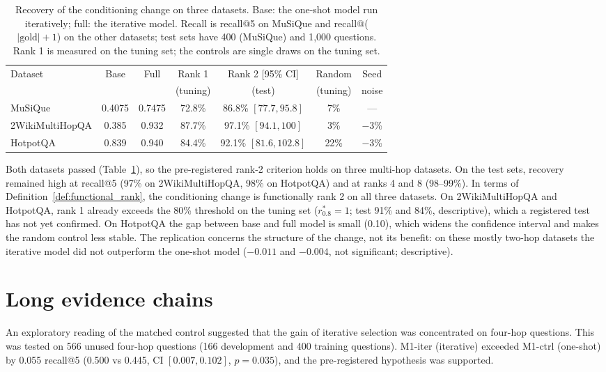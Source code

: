\begin{table}[htbp]
\centering
\caption{Recovery of the conditioning change on three datasets. Base: the one-shot model run iteratively; full: the iterative model. Recall is recall@5 on MuSiQue and recall@($|\text{gold}|+1$) on the other datasets; test sets have 400 (MuSiQue) and 1,000 questions. Rank 1 is measured on the tuning set; the controls are single draws on the tuning set.}
\label{tab:replication}
\footnotesize
\setlength{\tabcolsep}{4pt}
\begin{tabular}{lcccccc}
\toprule
Dataset & Base & Full & Rank 1 & Rank 2 [95\% CI] & Random & Seed \\
 & & & (tuning) & (test) & (tuning) & noise \\
\midrule
MuSiQue & 0.4075 & 0.7475 & 72.8\% & 86.8\% $[77.7, 95.8]$ & 7\% & --- \\
2WikiMultiHopQA & 0.385 & 0.932 & 87.7\% & 97.1\% $[94.1, 100]$ & 3\% & $-3$\% \\
HotpotQA & 0.839 & 0.940 & 84.4\% & 92.1\% $[81.6, 102.8]$ & 22\% & $-3$\% \\
\bottomrule
\end{tabular}
\end{table}

Both datasets passed (Table~\ref{tab:replication}), so the pre-registered rank-2 criterion holds on three multi-hop datasets. On the test sets, recovery remained high at recall@5 (97\% on 2WikiMultiHopQA, 98\% on HotpotQA) and at ranks 4 and 8 (98--99\%). In terms of Definition~\ref{def:functional_rank}, the conditioning change is functionally rank 2 on all three datasets. On 2WikiMultiHopQA and HotpotQA, rank 1 already exceeds the 80\% threshold on the tuning set ($r^*_{0.8}=1$; test 91\% and 84\%, descriptive), which a registered test has not yet confirmed. On HotpotQA the gap between base and full model is small (0.10), which widens the confidence interval and makes the random control less stable. The replication concerns the structure of the change, not its benefit: on these mostly two-hop datasets the iterative model did not outperform the one-shot model ($-0.011$ and $-0.004$, not significant; descriptive).

\section{Long evidence chains}
\label{sec:res_long}

An exploratory reading of the matched control suggested that the gain of iterative selection was concentrated on four-hop questions. This was tested on 566 unused four-hop questions (166 development and 400 training questions). M1-iter (iterative) exceeded M1-ctrl (one-shot) by 0.055 recall@5 (0.500 vs 0.445, CI $[0.007, 0.102]$, $p=0.035$), and the pre-registered hypothesis was supported.

